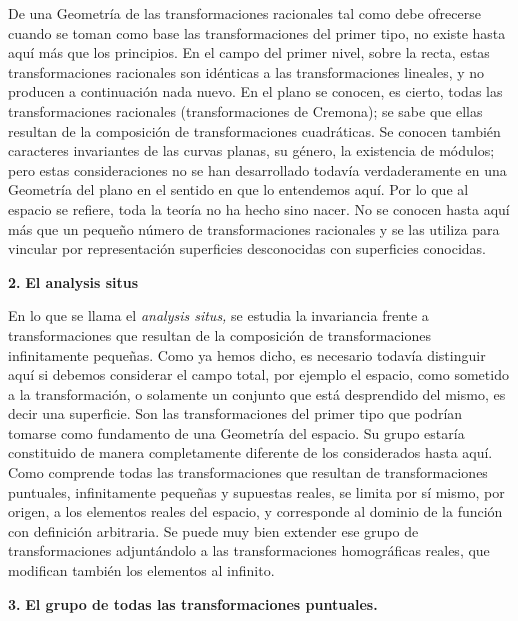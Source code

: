 \documentclass[a4paper, 12pt]{article}
\begin{document}
De una Geometría de las transformaciones racionales tal como debe ofrecerse cuando se toman como base las transformaciones del primer tipo, no existe hasta aquí más que los principios. En el campo del primer nivel, sobre la recta, estas transformaciones racionales son idénticas a las transformaciones lineales, y no producen a continuación nada nuevo. En el plano se conocen, es cierto, todas las transformaciones racionales (transformaciones de Cremona); se sabe que ellas resultan de la composición de transformaciones cuadráticas. Se conocen también caracteres invariantes de las curvas planas, su género, la existencia de módulos; pero estas consideraciones no se han desarrollado todavía verdaderamente en una Geometría del plano en el sentido en que lo entendemos aquí. Por lo que al espacio se refiere, toda la teoría no ha hecho sino nacer. No se conocen hasta aquí más que un pequeño número de transformaciones racionales y se las utiliza para vincular por representación superficies desconocidas con superficies conocidas. 

\bigskip

\textbf{2.} \textbf{El analysis situs}

 En lo que se llama el \textit{analysis situs,} se estudia la invariancia frente a transformaciones que resultan de la composición de transformaciones infinitamente pequeñas. Como ya hemos dicho, es necesario todavía distinguir aquí si debemos considerar el campo total, por ejemplo el espacio, como sometido a la transformación, o solamente un conjunto que está desprendido del mismo, es decir una superficie. Son las transformaciones del primer tipo que podrían tomarse como fundamento de una Geometría del espacio. Su grupo estaría constituido de manera completamente diferente de los considerados hasta aquí. Como comprende todas las transformaciones que resultan de transformaciones puntuales, infinitamente pequeñas y supuestas reales, se limita por sí mismo, por origen, a los elementos reales del espacio, y corresponde al dominio de la función con definición arbitraria. Se puede muy bien extender ese grupo de transformaciones adjuntándolo a las transformaciones homográficas reales, que modifican también los elementos al infinito. 

\bigskip

\textbf{3. }\textbf{El grupo de todas las transformaciones puntuales.} 
\end{document}
